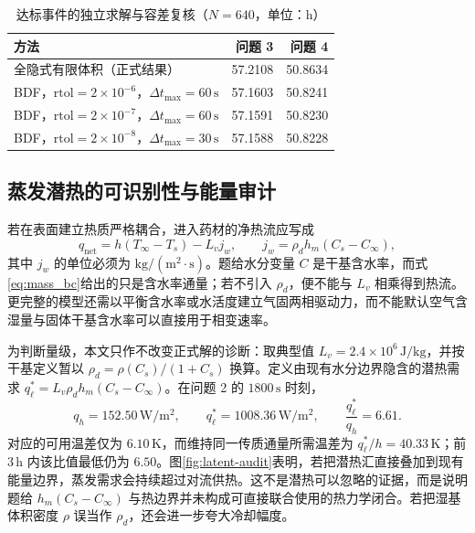 \documentclass[UTF8,a4paper,zihao=-4,fontset=fandol]{ctexart}
\newcommand{\unit}[1]{\,\mathrm{#1}}
\begin{document}
\begin{table}[H]
\centering
\caption{达标事件的独立求解与容差复核（$N=640$，单位：$\mathrm{h}$）}
\label{tab:eventaudit}
\small
\begin{tabular}{lrr}
\toprule
方法 & 问题 3 & 问题 4 \\
\midrule
全隐式有限体积（正式结果） & 57.2108 & 50.8634 \\
BDF，$\mathrm{rtol}=2\times10^{-6}$，$\Delta t_{\max}=60\unit{s}$ & 57.1603 & 50.8241 \\
BDF，$\mathrm{rtol}=2\times10^{-7}$，$\Delta t_{\max}=60\unit{s}$ & 57.1591 & 50.8230 \\
BDF，$\mathrm{rtol}=2\times10^{-8}$，$\Delta t_{\max}=30\unit{s}$ & 57.1588 & 50.8228 \\
\bottomrule
\end{tabular}
\end{table}

\subsection{蒸发潜热的可识别性与能量审计}

若在表面建立热质严格耦合，进入药材的净热流应写成
\begin{equation}
q_{\mathrm{net}}=h(T_\infty-T_s)-L_vj_w,
\qquad
j_w=\rho_dh_m(C_s-C_\infty),
\label{eq:latent_boundary}
\end{equation}
其中 $j_w$ 的单位必须为 $\mathrm{kg/(m^2\cdot s)}$。题给水分变量 $C$ 是干基含水率，而式\eqref{eq:mass_bc}给出的只是含水率通量；若不引入 $\rho_d$，便不能与 $L_v$ 相乘得到热流。更完整的模型还需以平衡含水率或水活度建立气固两相驱动力，而不能默认空气含湿量与固体干基含水率可以直接用于相变速率。

为判断量级，本文只作不改变正式解的诊断：取典型值 $L_v=2.4\times10^6\unit{J/kg}$，并按干基定义暂以 $\rho_d=\rho(C_s)/(1+C_s)$ 换算。定义由现有水分边界隐含的潜热需求 $q_\ell^*=L_v\rho_dh_m(C_s-C_\infty)$。在问题 2 的 $1800\unit{s}$ 时刻，
\begin{equation}
q_h=152.50\unit{W/m^2},\qquad
q_\ell^*=1008.36\unit{W/m^2},\qquad
\frac{q_\ell^*}{q_h}=6.61.
\end{equation}
对应的可用温差仅为 $6.10\unit{K}$，而维持同一传质通量所需温差为 $q_\ell^*/h=40.33\unit{K}$；前 $3\unit{h}$ 内该比值最低仍为 $6.50$。图\ref{fig:latent-audit}表明，若把潜热汇直接叠加到现有能量边界，蒸发需求会持续超过对流供热。这不是潜热可以忽略的证据，而是说明题给 $h_m(C_s-C_\infty)$ 与热边界并未构成可直接联合使用的热力学闭合。若把湿基体积密度 $\rho$ 误当作 $\rho_d$，还会进一步夸大冷却幅度。
\end{document}
